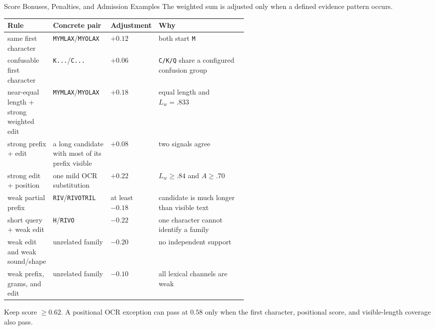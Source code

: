 \documentclass[aspectratio=169,10pt]{beamer}
\newcommand{\code}[1]{\texttt{#1}}
\begin{document}
\begin{frame}{Score Bonuses, Penalties, and Admission Examples}
\scriptsize
The weighted sum is adjusted only when a defined evidence pattern occurs.

\begin{tabularx}{\linewidth}{@{}L{0.19\linewidth}L{0.24\linewidth}L{0.13\linewidth}Y@{}}
\toprule
\textbf{Rule} & \textbf{Concrete pair} & \textbf{Adjustment} & \textbf{Why} \\
\midrule
same first character & \code{MYMLAX}/\code{MYOLAX} & $+0.12$ & both start \code{M} \\
confusable first character & \code{K...}/\code{C...} & $+0.06$ & \code{C/K/Q} share a configured confusion group \\
near-equal length + strong weighted edit & \code{MYMLAX}/\code{MYOLAX} & $+0.18$ & equal length and $L_w=.833$ \\
strong prefix + edit & a long candidate with most of its prefix visible & $+0.08$ & two signals agree \\
strong edit + position & one mild OCR substitution & $+0.22$ & $L_w\geq.84$ and $A\geq.70$ \\
weak partial prefix & \code{RIV}/\code{RIVOTRIL} & at least $-0.18$ & candidate is much longer than visible text \\
short query + weak edit & \code{H}/\code{RIVO} & $-0.22$ & one character cannot identify a family \\
weak edit and weak sound/shape & unrelated family & $-0.20$ & no independent support \\
weak prefix, grams, and edit & unrelated family & $-0.10$ & all lexical channels are weak \\
\bottomrule
\end{tabularx}

\vspace{1mm}
Keep score $\geq0.62$. A positional OCR exception can pass at $0.58$ only when
the first character, positional score, and visible-length coverage also pass.
\end{frame}
\end{document}
